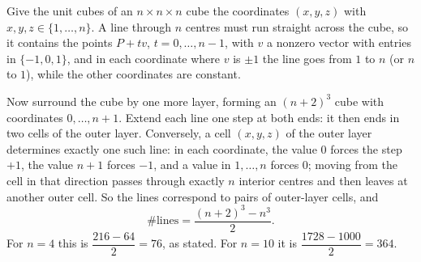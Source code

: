 Give the unit cubes of an $n\times n\times n$ cube the coordinates $(x,y,z)$ with $x,y,z\in\{1,\dots,n\}$. A line through $n$ centres must run straight across the cube, so it contains the points $P+tv$, $t=0,\dots,n-1$, with $v$ a nonzero vector with entries in $\{-1,0,1\}$, and in each coordinate where $v$ is $\pm1$ the line goes from $1$ to $n$ (or $n$ to $1$), while the other coordinates are constant.

Now surround the cube by one more layer, forming an $(n+2)^3$ cube with coordinates $0,\dots,n+1$. Extend each line one step at both ends: it then ends in two cells of the outer layer. Conversely, a cell $(x,y,z)$ of the outer layer determines exactly one such line: in each coordinate, the value $0$ forces the step $+1$, the value $n+1$ forces $-1$, and a value in $1,\dots,n$ forces $0$; moving from the cell in that direction passes through exactly $n$ interior centres and then leaves at another outer cell. So the lines correspond to pairs of outer-layer cells, and
\[
\#\text{lines}=\dfrac{(n+2)^3-n^3}{2}.
\]
For $n=4$ this is $\dfrac{216-64}{2}=76$, as stated. For $n=10$ it is $\dfrac{1728-1000}{2}=\boxed{364}$.
